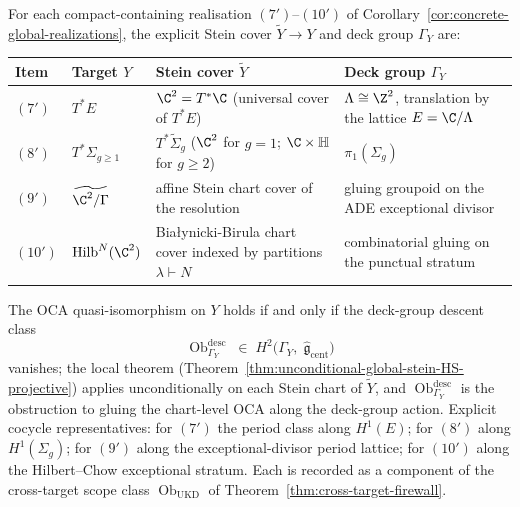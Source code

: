 \begin{cor}\label{cor:compact-containing-descent}
For each compact-containing realisation \((7')\)--\((10')\) of
Corollary~\ref{cor:concrete-global-realizations}, the explicit
Stein cover \(\widetilde Y\to Y\) and deck group \(\Gamma_Y\) are:
\begin{center}
\small
\begin{tabular}{@{}p{}p{}p{}p{}@{}}
\hline
\textbf{Item} & \textbf{Target \(Y\)} & \textbf{Stein cover \(\widetilde Y\)} & \textbf{Deck group \(\Gamma_Y\)}\\
\hline
\((7')\) & \(T^*E\) & \(\C^2=T^*\C\) (universal cover of \(T^*E\)) & \(\Lambda\cong\Z^2\), translation by the lattice \(E=\C/\Lambda\)\\
\((8')\) & \(T^*\Sigma_{g\geq 1}\) & \(T^*\widetilde\Sigma_g\) (\(\C^2\) for \(g=1\); \(\C\times\mathbb H\) for \(g\geq 2\)) & \(\pi_1(\Sigma_g)\)\\
\((9')\) & \(\widetilde{\C^2/\Gamma}\) & affine Stein chart cover of the resolution & gluing groupoid on the ADE exceptional divisor\\
\((10')\) & \(\mathrm{Hilb}^N(\C^2)\) & Bia\l ynicki-Birula chart cover indexed by partitions \(\lambda\vdash N\) & combinatorial gluing on the punctual stratum\\
\hline
\end{tabular}
\end{center}
The OCA quasi-isomorphism on \(Y\) holds if and only if the
deck-group descent class
\[
  \operatorname{Ob}^{\mathrm{desc}}_{\Gamma_Y}
   \;\in\;H^2\bigl(\Gamma_Y,\;
            \widehat{\mathfrak g}_{\mathrm{cent}}\bigr)
\]
vanishes; the local theorem
(Theorem~\ref{thm:unconditional-global-stein-HS-projective})
applies unconditionally on each Stein chart of \(\widetilde Y\), and
\(\operatorname{Ob}^{\mathrm{desc}}_{\Gamma_Y}\) is the obstruction
to gluing the chart-level OCA along the deck-group action.  Explicit
cocycle representatives: for \((7')\) the period class along
\(H^1(E)\); for \((8')\) along \(H^1(\Sigma_g)\); for \((9')\) along
the exceptional-divisor period lattice; for \((10')\) along the
Hilbert--Chow exceptional stratum.  Each is recorded as a component of the cross-target scope class
\(\operatorname{Ob}_{\mathrm{UKD}}\) of
Theorem~\ref{thm:cross-target-firewall}.
\end{cor}

